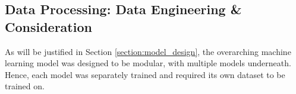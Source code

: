 \documentclass[journal, 12pt]{IEEEtran}
\begin{document}


\subsection{Data Processing: Data Engineering \& Consideration} 
\label{section:data_engineering}

\noindent As will be justified in Section \ref{section:model_design}, the overarching machine learning model was designed to be modular, with multiple models underneath. Hence, each model was separately trained and required its own dataset to be trained on.\\
\end{document}
